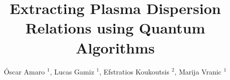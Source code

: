 \documentclass[12pt]{iopart}
\begin{document}

\title[Extracting Plasma Dispersion Relations using Quantum Algorithms]{Extracting Plasma Dispersion Relations using Quantum Algorithms}


\author{
    Óscar Amaro  $^1$,
    Lucas Gamiz  $^1$, %
    Efstratios Koukoutsis  $^2$,
    Marija Vranic  $^1$ %
  }

\address{$^1$ GoLP/Instituto de Plasma e Fus\~ao Nuclear, Instituto Superior T\'ecnico, Universidade de Lisboa, Lisbon, Portugal\\
$^2$ School of Electrical and Computer Engineering,
National Technical University of Athens, Zographou 15780, Greece\\
}

\normalsize

\vspace{10pt}
\end{document}
